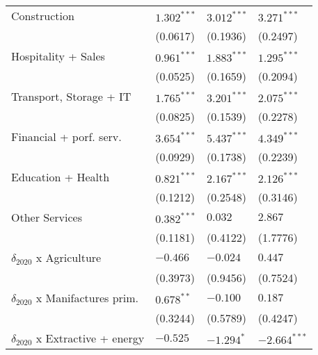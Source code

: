 \begin{tabular}{llll}
Construction                                       &      $1.302^{***}$ &      $3.012^{***}$ &      $3.271^{***}$ \\
                                                   &           (0.0617) &           (0.1936) &           (0.2497) \\
Hospitality + Sales                                &      $0.961^{***}$ &      $1.883^{***}$ &      $1.295^{***}$ \\
                                                   &           (0.0525) &           (0.1659) &           (0.2094) \\
Transport, Storage + IT                            &      $1.765^{***}$ &      $3.201^{***}$ &      $2.075^{***}$ \\
                                                   &           (0.0825) &           (0.1539) &           (0.2278) \\
Financial + porf. serv.                            &      $3.654^{***}$ &      $5.437^{***}$ &      $4.349^{***}$ \\
                                                   &           (0.0929) &           (0.1738) &           (0.2239) \\
Education + Health                                 &      $0.821^{***}$ &      $2.167^{***}$ &      $2.126^{***}$ \\
                                                   &           (0.1212) &           (0.2548) &           (0.3146) \\
Other Services                                     &      $0.382^{***}$ &            $0.032$ &            $2.867$ \\
                                                   &           (0.1181) &           (0.4122) &           (1.7776) \\
$\delta_{2020}$ x Agriculture                      &           $-0.466$ &           $-0.024$ &            $0.447$ \\
                                                   &           (0.3973) &           (0.9456) &           (0.7524) \\
$\delta_{2020}$ x Manifactures prim.               &       $0.678^{**}$ &           $-0.100$ &            $0.187$ \\
                                                   &           (0.3244) &           (0.5789) &           (0.4247) \\
$\delta_{2020}$ x Extractive + energy              &           $-0.525$ &         $-1.294^*$ &     $-2.664^{***}$ \\

\end{tabular}
